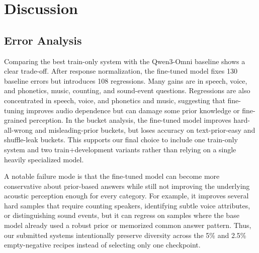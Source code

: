\documentclass{article}
\begin{document}
\section{Discussion}
\vspace{-10pt}
\subsection{Error Analysis}
Comparing the best train-only system with the Qwen3-Omni baseline shows a clear trade-off.
After response normalization, the fine-tuned model fixes 130 baseline errors but introduces 108 regressions.
Many gains are in speech, voice, and phonetics, music, counting, and sound-event questions.
Regressions are also concentrated in speech, voice, and phonetics and music, suggesting that fine-tuning improves audio dependence but can damage some prior knowledge or fine-grained perception.
In the bucket analysis, the fine-tuned model improves hard-all-wrong and misleading-prior buckets, but loses accuracy on text-prior-easy and shuffle-leak buckets.
This supports our final choice to include one train-only system and two train+development variants rather than relying on a single heavily specialized model.

A notable failure mode is that the fine-tuned model can become more conservative about prior-based answers while still not improving the underlying acoustic perception enough for every category.
For example, it improves several hard samples that require counting speakers, identifying subtle voice attributes, or distinguishing sound events, but it can regress on samples where the base model already used a robust prior or memorized common answer pattern.
Thus, our submitted systems intentionally preserve diversity across the 5\% and 2.5\% empty-negative recipes instead of selecting only one checkpoint.
\end{document}

